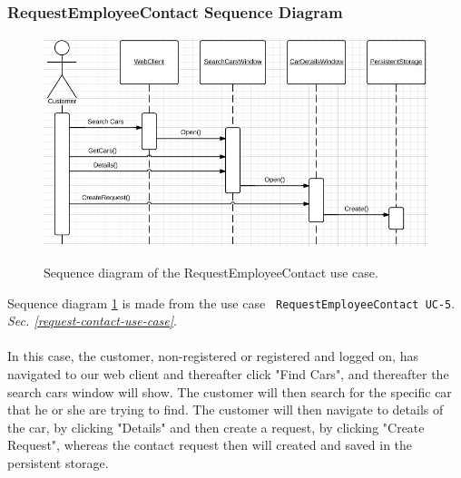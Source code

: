 \subsubsection{RequestEmployeeContact Sequence Diagram}
\begin{figure}[H]
	\centering
		\includegraphics[width=\textwidth]{Figures/SequenceDiagram-RequestEmployeeContact}\\
	\caption{Sequence diagram of the RequestEmployeeContact use case.}
  \label{fig:SequenceDiagram-RequestEmployeeContact}
\end{figure}

Sequence diagram \ref{fig:SequenceDiagram-RequestEmployeeContact} is made from the use case \texttt{ RequestEmployeeContact UC-5}. \textit{Sec. \ref{request-contact-use-case}}. \\\\
In this case, the customer, non-registered or registered and logged on, has navigated to our web client and thereafter click "Find Cars", and thereafter the search cars window will show. The customer will then search for the specific car that he or she are trying to find. The customer will then navigate to details of the car, by clicking "Details" and then create a request, by clicking "Create Request", whereas the contact request then will created and saved in the persistent storage.

